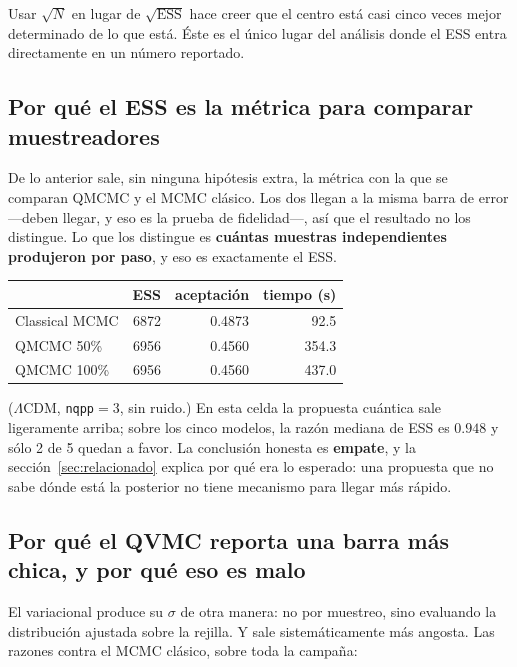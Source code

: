 \documentclass[11pt,a4paper]{article}
\begin{document}
\noindent
Usar $\sqrt{N}$ en lugar de $\sqrt{\mathrm{ESS}}$ hace creer que el centro está
casi cinco veces mejor determinado de lo que está. Éste es el único lugar del
análisis donde el ESS entra directamente en un número reportado.

\subsection{Por qué el ESS es la métrica para comparar muestreadores}

De lo anterior sale, sin ninguna hipótesis extra, la métrica con la que se
comparan QMCMC y el MCMC clásico. Los dos llegan a la misma barra de error
---deben llegar, y eso es la prueba de fidelidad---, así que el resultado no
los distingue. Lo que los distingue es \textbf{cuántas muestras independientes
produjeron por paso}, y eso es exactamente el ESS.

\begin{center}
\small
\begin{tabular}{lrrr}
\toprule
& ESS & aceptación & tiempo (s) \\
\midrule
Classical MCMC & 6872 & 0.4873 & 92.5 \\
QMCMC 50\% & 6956 & 0.4560 & 354.3 \\
QMCMC 100\% & 6956 & 0.4560 & 437.0 \\
\bottomrule
\end{tabular}
\end{center}

\noindent
($\Lambda$CDM, \texttt{nqpp}$=3$, sin ruido.) En esta celda la propuesta
cuántica sale ligeramente arriba; sobre los cinco modelos, la razón mediana de
ESS es $0.948$ y sólo 2 de 5 quedan a favor. La conclusión honesta es
\textbf{empate}, y la sección~\ref{sec:relacionado} explica por qué era lo esperado: una propuesta
que no sabe dónde está la posterior no tiene mecanismo para llegar más rápido.

\subsection{Por qué el QVMC reporta una barra más chica, y por qué eso es malo}

El variacional produce su $\sigma$ de otra manera: no por muestreo, sino
evaluando la distribución ajustada sobre la rejilla. Y sale sistemáticamente
más angosta. Las razones contra el MCMC clásico, sobre toda la campaña:
\end{document}
